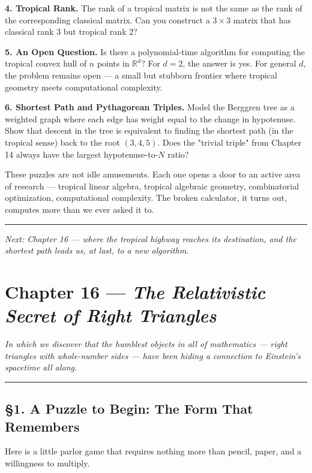 \documentclass[12pt, letterpaper, openany]{book}
\theoremstyle{definition}
\theoremstyle{remark}
\begin{document}
\textbf{4. Tropical Rank.} The rank of a tropical matrix is not the same as the rank of the corresponding classical matrix. Can you construct a $3 \times 3$ matrix that has classical rank $3$ but tropical rank $2$?

\textbf{5. An Open Question.} Is there a polynomial-time algorithm for computing the tropical convex hull of $n$ points in $\mathbb{R}^d$? For $d = 2$, the answer is yes. For general $d$, the problem remains open --- a small but stubborn frontier where tropical geometry meets computational complexity.

\textbf{6. Shortest Path and Pythagorean Triples.} Model the Berggren tree as a weighted graph where each edge has weight equal to the change in hypotenuse. Show that descent in the tree is equivalent to finding the shortest path (in the tropical sense) back to the root $(3, 4, 5)$. Does the "trivial triple" from Chapter 14 always have the largest hypotenuse-to-$N$ ratio?

These puzzles are not idle amusements. Each one opens a door to an active area of research --- tropical linear algebra, tropical algebraic geometry, combinatorial optimization, computational complexity. The broken calculator, it turns out, computes more than we ever asked it to.


\bigskip\noindent\rule{\textwidth}{0.4pt}\bigskip


\textit{Next: Chapter 16 --- where the tropical highway reaches its destination, and the shortest path leads us, at last, to a new algorithm.}


\clearpage

\chapter{Chapter 16 --- \textit{The Relativistic Secret of Right Triangles}}


\textit{In which we discover that the humblest objects in all of mathematics --- right triangles with whole-number sides --- have been hiding a connection to Einstein's spacetime all along.}


\bigskip\noindent\rule{\textwidth}{0.4pt}\bigskip



\section*{§1. A Puzzle to Begin: The Form That Remembers}


Here is a little parlor game that requires nothing more than pencil, paper, and a willingness to multiply.
\end{document}
